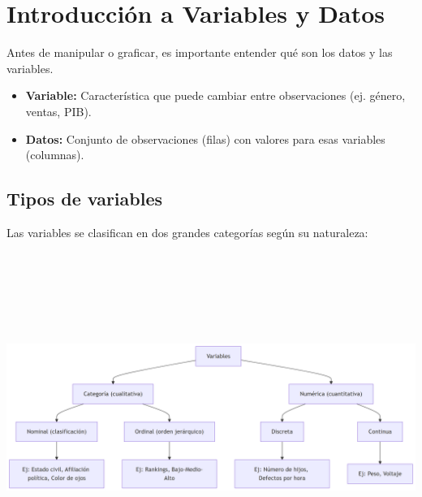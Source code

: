 \documentclass[
  spanish,
  letterpaper,
  DIV=11,
  numbers=noendperiod]{scrreprt}
\providecommand{\tightlist}{%
  \setlength{\itemsep}{0pt}\setlength{\parskip}{0pt}}
\begin{document}
\section{Introducción a Variables y
Datos}\label{introducciuxf3n-a-variables-y-datos}

Antes de manipular o graficar, es importante entender qué son los datos
y las variables.

\begin{tcolorbox}[enhanced jigsaw, toptitle=1mm, opacitybacktitle=0.6, leftrule=.75mm, arc=.35mm, title=\textcolor{quarto-callout-note-color}{\faInfo}\hspace{0.5em}{Definiciones clave}, colback=white, bottomrule=.15mm, colbacktitle=quarto-callout-note-color!10!white, opacityback=0, bottomtitle=1mm, breakable, rightrule=.15mm, coltitle=black, left=2mm, titlerule=0mm, colframe=quarto-callout-note-color-frame, toprule=.15mm]

\begin{itemize}
\tightlist
\item
  \textbf{Variable:} Característica que puede cambiar entre
  observaciones (ej. género, ventas, PIB).\\
\item
  \textbf{Datos:} Conjunto de observaciones (filas) con valores para
  esas variables (columnas).
\end{itemize}

\end{tcolorbox}

\subsection{Tipos de variables}\label{tipos-de-variables}

Las variables se clasifican en dos grandes categorías según su
naturaleza:

\includegraphics[width=11.72in,height=4.23in]{capitulo2_files/figure-latex/mermaid-figure-1.png}
\end{document}

